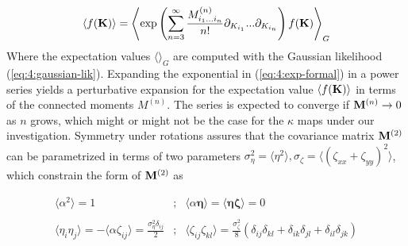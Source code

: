 \begin{equation}
\label{eq:4:exp-formal}
\langle f(\mathbf{K})\rangle = \left\langle\exp\left(\sum_{n=3}^\infty\frac{M^{(n)}_{i_1...i_n}}{n!}\partial_{K_{i_1}}...\partial_{K_{i_n}}\right)f(\mathbf{K})\right\rangle_G
\end{equation}
%
Where the expectation values $\langle\rangle_G$ are computed with the Gaussian likelihood (\ref{eq:4:gaussian-lik}). Expanding the exponential in (\ref{eq:4:exp-formal}) in a power series yields a perturbative expansion for the expectation value $\langle f(\mathbf{K})\rangle$ in terms of the connected moments $M^{(n)}$. The series is expected to converge if $\mathbf{M}^{(n)}\rightarrow 0$ as $n$ grows, which might or might not be the case for the $\kappa$ maps under our investigation. Symmetry under rotations assures that the covariance matrix $\mathbf{M}^{(2)}$ can be parametrized in terms of two parameters $\sigma^2_\eta=\langle\eta^2\rangle,\sigma_\zeta=\langle(\zeta_{xx}+\zeta_{yy})^2\rangle$, which constrain the form of $\mathbf{M}^{(2)}$ as 

\begin{equation}
\label{eq:4:cov-rotinv}
\begin{matrix}
\langle \alpha^2\rangle = 1 & ; & \langle \alpha \pmb{\eta} \rangle = \langle \pmb{\eta}\pmb{\zeta} \rangle = 0 \\ \\
\displaystyle \langle \eta_i\eta_j \rangle = -\langle \alpha \zeta_{ij} \rangle = \frac{\sigma_\eta^2 \delta_{ij}}{2} & ; & \displaystyle \langle \zeta_{ij}\zeta_{kl} \rangle = \frac{\sigma_\zeta^2}{8}(\delta_{ij}\delta_{kl}+\delta_{ik}\delta_{jl}+\delta_{il}\delta_{jk})
\end{matrix}
\end{equation}
%


